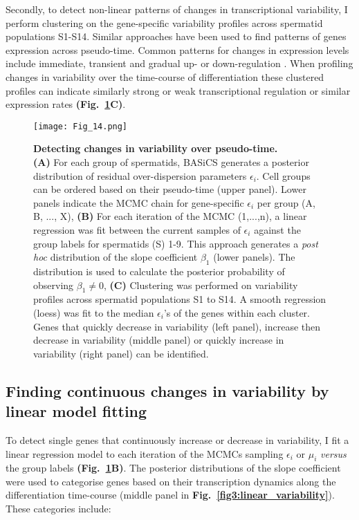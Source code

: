 Secondly, to detect non-linear patterns of changes in transcriptional variability, I perform clustering on the gene-specific variability profiles across spermatid populations S1-S14. Similar approaches have been used to find patterns of genes expression across pseudo-time. Common patterns for changes in expression levels include immediate, transient and gradual up- or down-regulation \citep{Trapnell2014}. When profiling changes in variability over the time-course of differentiation these clustered profiles can indicate similarly strong or weak transcriptional regulation or similar expression rates \textbf{(Fig.~\ref{fig3:variability_schematic}C)}.

\newpage

\begin{figure}[!h]
\centering
\texttt{[image: Fig\_14.png]}
\caption[Detecting changes in variability over pseudo-time]{\textbf{Detecting changes in variability over pseudo-time.}\\
\textbf{(A)} For each group of spermatids, BASiCS  generates a posterior distribution of residual over-dispersion parameters $\epsilon_i$. Cell groups can be ordered based on their pseudo-time (upper panel). Lower panels indicate the MCMC chain for gene-specific $\epsilon_i$ per group (A, B, ..., X), \textbf{(B)} For each iteration of the MCMC (1,...,n), a linear regression was fit between the current samples of $\epsilon_i$ against the group labels for spermatids (S) 1-9. This approach generates a \emph{post hoc} distribution of the slope coefficient $\beta_1$ (lower panels). The distribution is used to calculate the posterior probability of observing $\beta_1\neq0$, \textbf{(C)} Clustering was performed on variability profiles across spermatid populations S1 to S14. A smooth regression (loess) was fit to the median $\epsilon_i$'s of the genes within each cluster. Genes that quickly decrease in variability (left panel), increase then decrease in variability (middle panel) or quickly increase in variability (right panel) can be identified.}
\label{fig3:variability_schematic}
\end{figure}

\newpage

\subsection{Finding continuous changes in variability by linear model fitting}

To detect single genes that continuously increase or decrease in variability, I fit a linear regression model to each iteration of the MCMCs sampling $\epsilon_i$ or $\mu_i$ \emph{versus} the group labels \textbf{(Fig.~\ref{fig3:variability_schematic}B)}. The posterior distributions of the slope coefficient were used to categorise genes based on their transcription dynamics along the differentiation time-course (middle panel in \textbf{Fig.~\ref{fig3:linear_variability}}). These categories include: 

